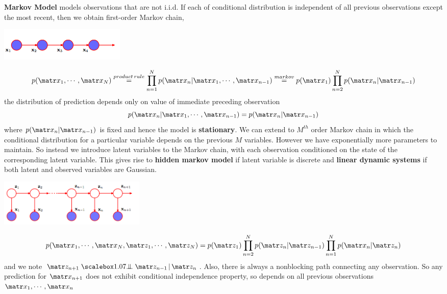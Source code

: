 \documentclass[11pt]{article}
\begin{document}
\begin{defn*}
    \textbf{Markov Model} models observations that are not i.i.d. If each of conditional distribution is independent of all previous observations except the most recent, then we obtain first-order Markov chain, 
    \begin{center}
        \includegraphics[width=6cm]{first_order_markov_chain.png}
    \end{center} 
    \[
        p(\bx_1, \cdots, \bx_N) 
        \overset{product\,rule}{=} \prod_{n=1}^N p(\bx_n | \bx_1, \cdots, \bx_{n-1})
        \overset{markov}{=} p(\bx_1) \prod_{n=2}^N p(\bx_n | \bx_{n-1})
    \]
    the distribution of prediction depends only on value of immediate preceding observation 
    \[
        p(\bx_n | \bx_1 ,\cdots, \bx_{n-1}) = p(\bx_n | \bx_{n-1})
    \]
    where $p(\bx_n | \bx_{n-1})$ is fixed and hence the model is \textbf{stationary}. We can extend to $M^{th}$ order Markov chain in which the conditional distribution for a particular variable depends on the previous $M$ variables. However we have exponentially more parameters to maintain. So instead we introduce latent variables to the Markov chain, with each observation conditioned on the state of the corresponding latent variable. This gives rise to \textbf{hidden markov model} if latent variable is discrete and \textbf{linear dynamic systems} if both latent and observed variables are Gaussian.
    \begin{center}
        \includegraphics[width=7cm]{hmm.png}
    \end{center}
    \[
        p(\bx_1, \cdots, \bx_N, \bz_1, \cdots, \bz_N)
        = p(\bz_1) \prod_{n=2}^N p(\bz_n | \bz_{n-1}) \prod_{n=1}^N p(\bx_n | \bz_n)
    \]
    and we note $\condi{\bz_{n+1}}{\bz_{n-1}}{\bz_n}$. Also, there is always a nonblocking path connecting any observation. So any prediction for $\bx_{n+1}$ does not exhibit conditional independence property, so depends on all previous observations $\bx_1, \cdots, \bx_n$
\end{defn*}
\end{document}
